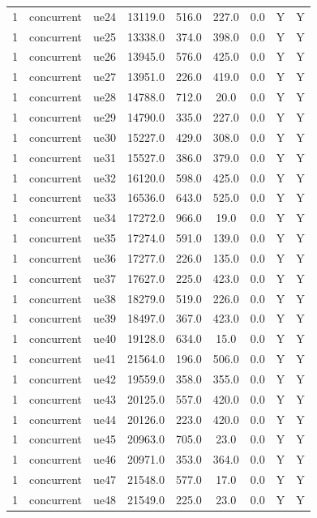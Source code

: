 \begin{table}[ht]
\begin{tabular}{|c|c|c|c|c|c|c|c|c|}
1 & concurrent & ue24 & 13119.0 & 516.0 & 227.0 & 0.0 & Y & Y \\
1 & concurrent & ue25 & 13338.0 & 374.0 & 398.0 & 0.0 & Y & Y \\
1 & concurrent & ue26 & 13945.0 & 576.0 & 425.0 & 0.0 & Y & Y \\
1 & concurrent & ue27 & 13951.0 & 226.0 & 419.0 & 0.0 & Y & Y \\
1 & concurrent & ue28 & 14788.0 & 712.0 & 20.0 & 0.0 & Y & Y \\
1 & concurrent & ue29 & 14790.0 & 335.0 & 227.0 & 0.0 & Y & Y \\
1 & concurrent & ue30 & 15227.0 & 429.0 & 308.0 & 0.0 & Y & Y \\
1 & concurrent & ue31 & 15527.0 & 386.0 & 379.0 & 0.0 & Y & Y \\
1 & concurrent & ue32 & 16120.0 & 598.0 & 425.0 & 0.0 & Y & Y \\
1 & concurrent & ue33 & 16536.0 & 643.0 & 525.0 & 0.0 & Y & Y \\
1 & concurrent & ue34 & 17272.0 & 966.0 & 19.0 & 0.0 & Y & Y \\
1 & concurrent & ue35 & 17274.0 & 591.0 & 139.0 & 0.0 & Y & Y \\
1 & concurrent & ue36 & 17277.0 & 226.0 & 135.0 & 0.0 & Y & Y \\
1 & concurrent & ue37 & 17627.0 & 225.0 & 423.0 & 0.0 & Y & Y \\
1 & concurrent & ue38 & 18279.0 & 519.0 & 226.0 & 0.0 & Y & Y \\
1 & concurrent & ue39 & 18497.0 & 367.0 & 423.0 & 0.0 & Y & Y \\
1 & concurrent & ue40 & 19128.0 & 634.0 & 15.0 & 0.0 & Y & Y \\
1 & concurrent & ue41 & 21564.0 & 196.0 & 506.0 & 0.0 & Y & Y \\
1 & concurrent & ue42 & 19559.0 & 358.0 & 355.0 & 0.0 & Y & Y \\
1 & concurrent & ue43 & 20125.0 & 557.0 & 420.0 & 0.0 & Y & Y \\
1 & concurrent & ue44 & 20126.0 & 223.0 & 420.0 & 0.0 & Y & Y \\
1 & concurrent & ue45 & 20963.0 & 705.0 & 23.0 & 0.0 & Y & Y \\
1 & concurrent & ue46 & 20971.0 & 353.0 & 364.0 & 0.0 & Y & Y \\
1 & concurrent & ue47 & 21548.0 & 577.0 & 17.0 & 0.0 & Y & Y \\
1 & concurrent & ue48 & 21549.0 & 225.0 & 23.0 & 0.0 & Y & Y \\

\end{tabular}
\end{table}
